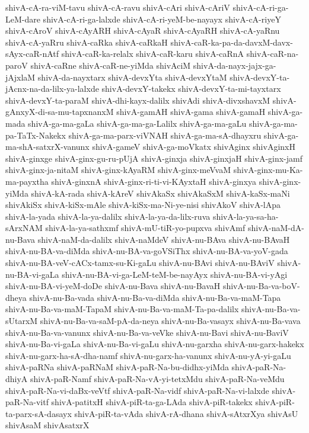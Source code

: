 {shivA-cA-ra-viM-tavu
shivA-cA-ravu
shivA-cAri
shivA-cAriV
shivA-cA-ri-ga-LeM-dare
shivA-cA-ri-ga-lalxde
shivA-cA-ri-yeM-be-nayayx
shivA-cA-riyeY
shivA-cAroV
shivA-cAyARH
shivA-cAyaR
shivA-cAyaRH
shivA-cA-yaRnu
shivA-cA-yaRru
shivA-caRka
shivA-caRkaH
shivA-caR-ka-pa-da-davxM-davx-sAyx-caR-nAtf
shivA-caR-ka-relalx
shivA-caR-karu
shivA-caRnA
shivA-caR-na-paroV
shivA-caRne
shivA-caR-ne-yiMda
shivAciM
shivA-da-nayx-jajx-ga-jAjxlaM
shivA-da-nayxtarx
shivA-devxYta
shivA-devxYtaM
shivA-devxY-ta-jAcnx-na-da-lilx-ya-lalxde
shivA-devxY-takekx
shivA-devxY-ta-mi-tayxtarx
shivA-devxY-ta-paraM
shivA-dhi-kayx-dalilx
shivAdi
shivA-divxshavxM
shivA-gAnxyX-di-sa-mu-tapxnanxM
shivA-gamAH
shivA-gama
shivA-gamaH
shivA-ga-mada
shivA-ga-ma-gaLa
shivA-ga-ma-ga-Lalilx
shivA-ga-ma-gaLu
shivA-ga-ma-pa-TaTx-Nakekx
shivA-ga-ma-parx-viVNAH
shivA-ga-ma-sA-dhayxru
shivA-ga-ma-shA-satxrX-vanunx
shivA-gameV
shivA-ga-moVkatx
shivAginx
shivAginxH
shivA-ginxge
shivA-ginx-gu-ru-pUjA
shivA-ginxja
shivA-ginxjaH
shivA-ginx-jamf
shivA-ginx-ja-nitaM
shivA-ginx-kAyaRM
shivA-ginx-meVvaM
shivA-ginx-mu-Ka-ma-payxtha
shivA-ginxnA
shivA-ginx-ri-ti-vi-KAyxtaH
shivA-ginxya
shivA-ginx-yiMda
shivA-kA-rada
shivA-kAreV
shivAkaSx
shivAkaSxM
shivA-kaSx-maNi
shivAkiSx
shivA-kiSx-mAle
shivA-kiSx-ma-Ni-ye-nisi
shivAkoV
shivA-lApa
shivA-la-yada
shivA-la-ya-dalilx
shivA-la-ya-da-lilx-ruva
shivA-la-ya-sa-ha-sArxNAM
shivA-la-ya-sathxmf
shivA-mU-tiR-yo-pupxva
shivAmf
shivA-naM-dA-nu-Bava
shivA-naM-da-dalilx
shivA-naMdeV
shivA-nu-BAva
shivA-nu-BAvaH
shivA-nu-BA-va-diMda
shivA-nu-BA-va-goVSiThx
shivA-nu-BA-va-yoV-gada
shivA-nu-BA-veV-cACx-tamx-su-Ki-gaLu
shivA-nu-BAvi
shivA-nu-BAviV
shivA-nu-BA-vi-gaLa
shivA-nu-BA-vi-ga-LeM-teM-be-nayAyx
shivA-nu-BA-vi-yAgi
shivA-nu-BA-vi-yeM-doDe
shivA-nu-Bava
shivA-nu-BavaH
shivA-nu-Ba-va-boV-dheya
shivA-nu-Ba-vada
shivA-nu-Ba-va-diMda
shivA-nu-Ba-va-maM-Tapa
shivA-nu-Ba-va-maM-TapaM
shivA-nu-Ba-va-maM-Ta-pa-dalilx
shivA-nu-Ba-va-sUtarxM
shivA-nu-Ba-va-saM-pA-da-neya
shivA-nu-Ba-vasayx
shivA-nu-Ba-vava
shivA-nu-Ba-va-vanunx
shivA-nu-Ba-va-veVke
shivA-nu-Bavi
shivA-nu-BaviV
shivA-nu-Ba-vi-gaLa
shivA-nu-Ba-vi-gaLu
shivA-nu-garxha
shivA-nu-garx-hakekx
shivA-nu-garx-ha-sA-dha-namf
shivA-nu-garx-ha-vanunx
shivA-nu-yA-yi-gaLu
shivA-paRNa
shivA-paRNaM
shivA-paR-Na-bu-didhx-yiMda
shivA-paR-Na-dhiyA
shivA-paR-Namf
shivA-paR-Na-vA-yi-tetxMdu
shivA-paR-Na-veMdu
shivA-paR-Na-vi-daBx-veVtf
shivA-paR-Na-vidf
shivA-paR-Na-vi-lalxde
shivA-paR-Na-vitf
shivA-patitxH
shivA-piR-ta-ga-LAda
shivA-piR-takekx
shivA-piR-ta-parx-sA-dasayx
shivA-piR-ta-vAda
shivA-rA-dhana
shivA-sAtxrXya
shivAsU
shivAsaM
shivAsatxrX
}
